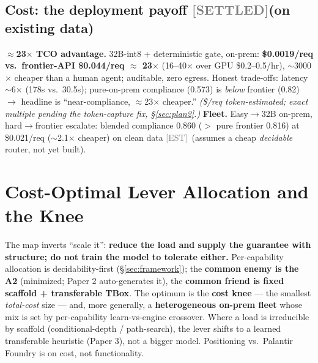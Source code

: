 \documentclass[10pt]{article}
\newcommand{\est}{\textcolor{gray}{\small[EST]}}
\newcommand{\settled}{\textcolor{gray}{\small[SETTLED]}}
\begin{document}
\subsection{Cost: the deployment payoff \settled (on existing data)}\label{sec:cost}
\textbf{$\approx$23$\times$ TCO advantage.} 32B-int8 + deterministic gate, on-prem: \textbf{\$0.0019/req vs.\ frontier-API \$0.044/req $\approx$ 23$\times$} (16--40$\times$ over GPU \$0.2--0.5/hr), $\sim$3000$\times$ cheaper than a human agent; auditable, zero egress. Honest trade-offs: latency $\sim$6$\times$ (178s vs.\ 30.5s); pure-on-prem compliance (0.573) is \emph{below} frontier (0.82) $\to$ headline is ``near-compliance, $\approx$23$\times$ cheaper.'' \emph{(\$/req token-estimated; exact multiple pending the token-capture fix, \S\ref{sec:plan2}.)}
\textbf{Fleet.} Easy$\to$32B on-prem, hard$\to$frontier escalate: blended compliance 0.860 ($>$ pure frontier 0.816) at \$0.021/req ($\sim$2.1$\times$ cheaper) on clean data \est\ (assumes a cheap \emph{decidable} router, not yet built).

\section{Cost-Optimal Lever Allocation and the Knee}\label{sec:knee}
The map inverts ``scale it'': \textbf{reduce the load and supply the guarantee with structure; do not train the model to tolerate either.} Per-capability allocation is decidability-first (\S\ref{sec:framework}); the \textbf{common enemy is the A2} (minimized; Paper 2 auto-generates it), the \textbf{common friend is fixed scaffold + transferable TBox}. The optimum is the \textbf{cost knee} --- the smallest \emph{total-cost} size --- and, more generally, a \textbf{heterogeneous on-prem fleet} whose mix is set by per-capability learn-vs-engine crossover. Where a load is irreducible by scaffold (conditional-depth / path-search), the lever shifts to a learned transferable heuristic (Paper 3), not a bigger model. Positioning vs.\ Palantir Foundry is on cost, not functionality.
\end{document}

